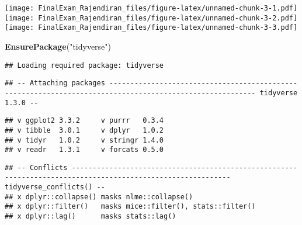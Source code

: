 \documentclass[]{article}
\newenvironment{Shaded}{\begin{snugshade}}{\end{snugshade}}
\newcommand{\KeywordTok}[1]{\textcolor[rgb]{0.13,0.29,0.53}{\textbf{#1}}}
\newcommand{\NormalTok}[1]{#1}
\newcommand{\StringTok}[1]{\textcolor[rgb]{0.31,0.60,0.02}{#1}}
\begin{document}
\texttt{[image: FinalExam\_Rajendiran\_files/figure-latex/unnamed-chunk-3-1.pdf]}
\texttt{[image: FinalExam\_Rajendiran\_files/figure-latex/unnamed-chunk-3-2.pdf]}
\texttt{[image: FinalExam\_Rajendiran\_files/figure-latex/unnamed-chunk-3-3.pdf]}

\begin{Shaded}
\begin{Highlighting}[]
\KeywordTok{EnsurePackage}\NormalTok{(}\StringTok{"tidyverse"}\NormalTok{)}
\end{Highlighting}
\end{Shaded}

\begin{verbatim}
## Loading required package: tidyverse
\end{verbatim}

\begin{verbatim}
## -- Attaching packages --------------------------------------------------------------------------------------------------------- tidyverse 1.3.0 --
\end{verbatim}

\begin{verbatim}
## v ggplot2 3.3.2     v purrr   0.3.4
## v tibble  3.0.1     v dplyr   1.0.2
## v tidyr   1.0.2     v stringr 1.4.0
## v readr   1.3.1     v forcats 0.5.0
\end{verbatim}

\begin{verbatim}
## -- Conflicts ------------------------------------------------------------------------------------------------------------ tidyverse_conflicts() --
## x dplyr::collapse() masks nlme::collapse()
## x dplyr::filter()   masks mice::filter(), stats::filter()
## x dplyr::lag()      masks stats::lag()
\end{verbatim}
\end{document}
